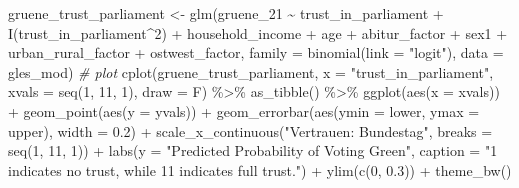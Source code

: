 \documentclass[
]{article}
\newenvironment{Shaded}{\begin{snugshade}}{\end{snugshade}}
\newcommand{\AttributeTok}[1]{\textcolor[rgb]{0.77,0.63,0.00}{#1}}
\newcommand{\CommentTok}[1]{\textcolor[rgb]{0.56,0.35,0.01}{\textit{#1}}}
\newcommand{\DecValTok}[1]{\textcolor[rgb]{0.00,0.00,0.81}{#1}}
\newcommand{\FloatTok}[1]{\textcolor[rgb]{0.00,0.00,0.81}{#1}}
\newcommand{\FunctionTok}[1]{\textcolor[rgb]{0.00,0.00,0.00}{#1}}
\newcommand{\NormalTok}[1]{#1}
\newcommand{\OtherTok}[1]{\textcolor[rgb]{0.56,0.35,0.01}{#1}}
\newcommand{\SpecialCharTok}[1]{\textcolor[rgb]{0.00,0.00,0.00}{#1}}
\newcommand{\StringTok}[1]{\textcolor[rgb]{0.31,0.60,0.02}{#1}}
\begin{document}
\begin{Shaded}
\begin{Highlighting}[]
\NormalTok{gruene\_trust\_parliament }\OtherTok{\textless{}{-}} \FunctionTok{glm}\NormalTok{(gruene\_21 }\SpecialCharTok{\textasciitilde{}}\NormalTok{ trust\_in\_parliament }\SpecialCharTok{+} \FunctionTok{I}\NormalTok{(trust\_in\_parliament}\SpecialCharTok{\^{}}\DecValTok{2}\NormalTok{) }\SpecialCharTok{+}\NormalTok{ household\_income }\SpecialCharTok{+}\NormalTok{ age }\SpecialCharTok{+}\NormalTok{ abitur\_factor }\SpecialCharTok{+}\NormalTok{ sex1 }\SpecialCharTok{+}\NormalTok{ urban\_rural\_factor }\SpecialCharTok{+}\NormalTok{ ostwest\_factor, }\AttributeTok{family =} \FunctionTok{binomial}\NormalTok{(}\AttributeTok{link =} \StringTok{"logit"}\NormalTok{), }\AttributeTok{data =}\NormalTok{ gles\_mod)}
\CommentTok{\# plot}
\FunctionTok{cplot}\NormalTok{(gruene\_trust\_parliament, }\AttributeTok{x =} \StringTok{"trust\_in\_parliament"}\NormalTok{, }
      \AttributeTok{xvals =} \FunctionTok{seq}\NormalTok{(}\DecValTok{1}\NormalTok{, }\DecValTok{11}\NormalTok{, }\DecValTok{1}\NormalTok{), }\AttributeTok{draw =}\NormalTok{ F) }\SpecialCharTok{\%\textgreater{}\%}
  \FunctionTok{as\_tibble}\NormalTok{() }\SpecialCharTok{\%\textgreater{}\%}
  \FunctionTok{ggplot}\NormalTok{(}\FunctionTok{aes}\NormalTok{(}\AttributeTok{x =}\NormalTok{ xvals)) }\SpecialCharTok{+}
  \FunctionTok{geom\_point}\NormalTok{(}\FunctionTok{aes}\NormalTok{(}\AttributeTok{y =}\NormalTok{ yvals)) }\SpecialCharTok{+}
  \FunctionTok{geom\_errorbar}\NormalTok{(}\FunctionTok{aes}\NormalTok{(}\AttributeTok{ymin =}\NormalTok{ lower, }\AttributeTok{ymax =}\NormalTok{ upper), }\AttributeTok{width =} \FloatTok{0.2}\NormalTok{) }\SpecialCharTok{+}
  \FunctionTok{scale\_x\_continuous}\NormalTok{(}\StringTok{"Vertrauen: Bundestag"}\NormalTok{, }
                     \AttributeTok{breaks =} \FunctionTok{seq}\NormalTok{(}\DecValTok{1}\NormalTok{, }\DecValTok{11}\NormalTok{, }\DecValTok{1}\NormalTok{)) }\SpecialCharTok{+}
  \FunctionTok{labs}\NormalTok{(}\AttributeTok{y =} \StringTok{"Predicted Probability of Voting Green"}\NormalTok{, }
       \AttributeTok{caption =} \StringTok{"\textquotesingle{}1\textquotesingle{} indicates \textquotesingle{}no trust\textquotesingle{}, while 11 indicates \textquotesingle{}full trust\textquotesingle{}."}\NormalTok{) }\SpecialCharTok{+}
  \FunctionTok{ylim}\NormalTok{(}\FunctionTok{c}\NormalTok{(}\DecValTok{0}\NormalTok{, }\FloatTok{0.3}\NormalTok{)) }\SpecialCharTok{+}
  \FunctionTok{theme\_bw}\NormalTok{()}
\end{Highlighting}
\end{Shaded}
\end{document}
